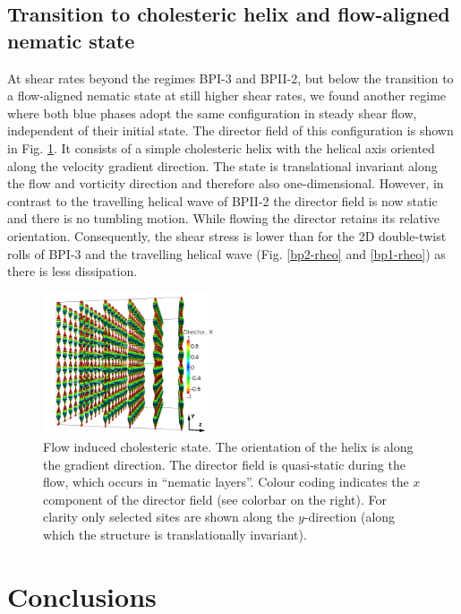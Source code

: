\documentclass[8.5pt,twoside,twocolumn]{article}
\begin{document}
\subsection{Transition to cholesteric helix and flow-aligned nematic state}\label{cholflow}

At shear rates beyond the regimes BPI-3 and BPII-2, but below the transition to a 
flow-aligned nematic state at still higher shear rates, we found another regime where 
both blue phases adopt the same configuration in steady shear flow, 
independent of their initial state.
The director field of this configuration is shown in Fig. \ref{fig:cholflow}.
It consists of a simple cholesteric helix with the helical axis oriented 
along the velocity gradient direction. The state is translational invariant 
along the flow and vorticity direction and therefore also one-dimensional. 
However, in contrast to the travelling helical wave of BPII-2 the 
director field is now static and there is no tumbling motion. 
While flowing the director retains its relative orientation.
Consequently, the shear stress is lower than for
the 2D double-twist rolls of BPI-3 and the travelling helical wave
(Fig. \ref{bp2-rheo} and \ref{bp1-rheo}) as there is less dissipation.
 
\begin{figure}[htpb]
\includegraphics[width=0.45\textwidth]{dir3d+y-200k_run1179.png}
\caption{Flow induced cholesteric state. The orientation of the helix is 
along the gradient direction. The director field is quasi-static during 
the flow, which occurs in ``nematic layers''. Colour coding indicates the 
$x$ component of the director field (see colorbar on the right).
For clarity only selected sites are shown along the $y$-direction (along which
the structure is translationally invariant).}
\label{fig:cholflow}
\end{figure}




\section{Conclusions}
\end{document}
